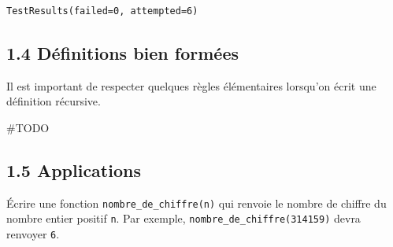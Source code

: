 \documentclass[a4paper,17pt]{extarticle}
\makeatletter
\newcommand{\boxspacing}{\kern\kvtcb@left@rule\kern\kvtcb@boxsep}
\newcommand{\prompt}[4]{
        \ttfamily\llap{{\color{#2}[#3]:\hspace{3pt}#4}}\vspace{-\baselineskip}
    }
\makeatother
\begin{document}
\begin{reponse}
\begin{multicols}{2}
    \end{multicols}

            \begin{tcolorbox}[breakable, size=fbox, boxrule=.5pt, pad at break*=1mm, opacityfill=0]
\prompt{Out}{outcolor}{17}{\boxspacing}
\begin{Verbatim}[commandchars=\\\{\}]
TestResults(failed=0, attempted=6)
\end{Verbatim}
\end{tcolorbox}
        
            \end{reponse}
    \hypertarget{duxe9finitions-bien-formuxe9es}{%
\subsection{1.4 Définitions bien
formées}\label{duxe9finitions-bien-formuxe9es}}

    Il est important de respecter quelques règles élémentaires lorsqu'on
écrit une définition récursive.

    \#TODO

    \hypertarget{applications}{%
\subsection{1.5 Applications}\label{applications}}

    Écrire une fonction \texttt{nombre\_de\_chiffre(n)} qui renvoie le
nombre de chiffre du nombre entier positif \texttt{n}. Par exemple,
\texttt{nombre\_de\_chiffre(314159)} devra renvoyer \texttt{6}.
\end{document}
